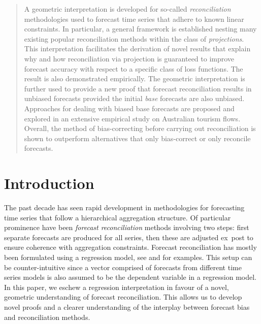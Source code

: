 \documentclass[12pt]{article}
\theoremstyle{definition}
\def\spacingset#1{\renewcommand{\baselinestretch}%
    {#1}\small\normalsize} \spacingset{1}
\begin{document}
\begin{abstract}
\spacingset{1.45}
  A geometric interpretation is developed for so-called \emph{reconciliation} methodologies used to forecast time series that adhere to known linear constraints. In particular, a general framework is established nesting many existing popular reconciliation methods within the class of \emph{projections}. This interpretation facilitates the derivation of novel results that explain why and how reconciliation via projection is guaranteed to improve forecast accuracy with respect to a specific class of loss functions. The result is also demonstrated empirically. The geometric interpretation is further used to provide a new proof that forecast reconciliation results in unbiased forecasts provided the initial \emph{base} forecasts are also unbiased. Approaches for dealing with biased base forecasts are proposed and explored in an extensive empirical study on Australian tourism flows. Overall, the method of bias-correcting before carrying out reconciliation is shown to outperform alternatives that only bias-correct or only reconcile forecasts.

\end{abstract}
	
	
	\newpage
	\spacingset{1.45} %
	
	\section{Introduction}\label{sec:intro}

The past decade has seen rapid development in methodologies for forecasting time series that follow a hierarchical aggregation structure. Of particular prominence have been \emph{forecast reconciliation} methods involving two steps: first separate forecasts are produced for all series, then these are adjusted ex~post to ensure coherence with aggregation constraints. Forecast reconciliation has mostly been formulated using a regression model, see \citet{Hyndman2011} and \citet{WicEtAl2019} for examples. This setup can be counter-intuitive since a vector comprised of forecasts from different time series models is also assumed to be the dependent variable in a regression model. In this paper, we eschew a regression interpretation in favour of a novel, geometric understanding of forecast reconciliation. This allows us to develop novel proofs and a clearer understanding of the interplay between forecast bias and reconciliation methods.
\end{document}
